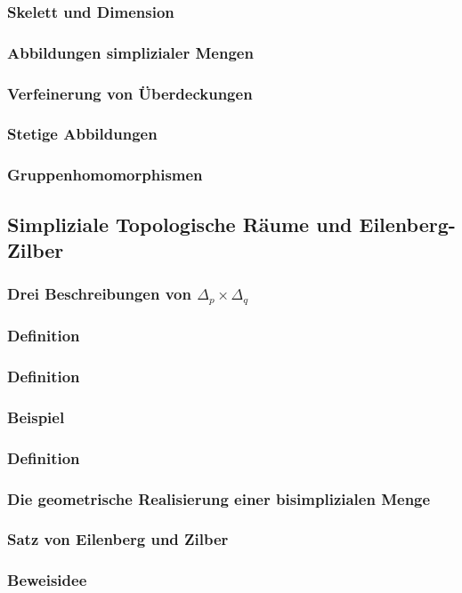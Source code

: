 \subsubsection{Skelett und Dimension}
\subsubsection{Abbildungen simplizialer Mengen}
\subsubsection{Verfeinerung von Überdeckungen}
\subsubsection{Stetige Abbildungen}
\subsubsection{Gruppenhomomorphismen}
\subsection{Simpliziale Topologische Räume und Eilenberg-Zilber}
\subsubsection{Drei Beschreibungen von $\Delta_p\times\Delta_q$}
\subsubsection{Definition}
\subsubsection{Definition}
\subsubsection{Beispiel}
\subsubsection{Definition}
\subsubsection{Die geometrische Realisierung einer bisimplizialen Menge}
\subsubsection{Satz von Eilenberg und Zilber}
\subsubsection{Beweisidee}

